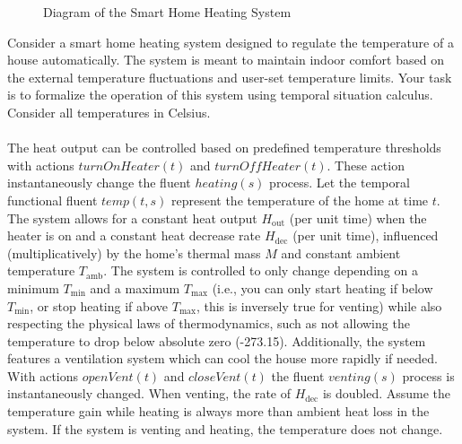 \documentclass{assignment}
\begin{document}
\begin{problem}
\begin{figure}[h]
\caption{Diagram of the Smart Home Heating System}
\end{figure}

Consider a smart home heating system designed to regulate the temperature of a house automatically. The system is meant to maintain indoor comfort based on the external temperature fluctuations and user-set temperature limits. Your task is to formalize the operation of this system using temporal situation calculus. Consider all temperatures in Celsius. \\
\\
The heat output can be controlled based on predefined temperature thresholds with actions $turnOnHeater(t)$ and $turnOffHeater(t)$. These action instantaneously change the fluent $heating(s)$ process. Let the temporal functional fluent $temp(t, s)$ represent the temperature of the home at time $t$. The system allows for a constant heat output $H_{\text{out}}$ (per unit time) when the heater is on and a constant heat decrease rate $H_{\text{dec}}$ (per unit time), influenced (multiplicatively) by the home's thermal mass $M$ and constant ambient temperature $T_{\text{amb}}$. The system is controlled to only change depending on a minimum $T_{\text{min}}$ and a maximum $T_{\text{max}}$ (i.e., you can only start heating if below $T_{\text{min}}$, or stop heating if above $T_{\text{max}}$, this is inversely true for venting) while also respecting the physical laws of thermodynamics, such as not allowing the temperature to drop below absolute zero (-273.15). Additionally, the system features a ventilation system which can cool the house more rapidly if needed. With actions $openVent(t)$ and $closeVent(t)$ the fluent $venting(s)$ process is instantaneously changed. When venting, the rate of $H_{\text{dec}}$ is doubled. Assume the temperature gain while heating is always more than ambient heat loss in the system. If the system is venting and heating, the temperature does not change.

\end{problem}
\end{document}
